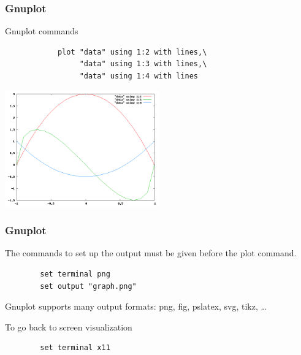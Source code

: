 \documentclass{beamer}
\begin{document}

\begin{frame}[fragile]

    \frametitle{Gnuplot}

    \begin{block}{Gnuplot commands}
        \begin{verbatim}
            plot "data" using 1:2 with lines,\
                 "data" using 1:3 with lines,\
                 "data" using 1:4 with lines
        \end{verbatim}
    \end{block}

    \begin{center}
        \includegraphics[width=0.5\textwidth]{images/graph}
    \end{center}

\end{frame}


\begin{frame}[fragile]

    \frametitle{Gnuplot}

    \begin{block}{The commands to set up the output must be given before the
    plot command.}

        \begin{verbatim}
        set terminal png
        set output "graph.png"
        \end{verbatim}

    \end{block}

    \vspace{1cm}

    \begin{block}{}
        Gnuplot supports many output formats: png, fig, pslatex, svg, tikz, \ldots
    \end{block}

    \vspace{1cm}

    \begin{block}{To go back to screen visualization}

        \begin{verbatim}
        set terminal x11
        \end{verbatim}

    \end{block}

\end{frame}
\end{document}
